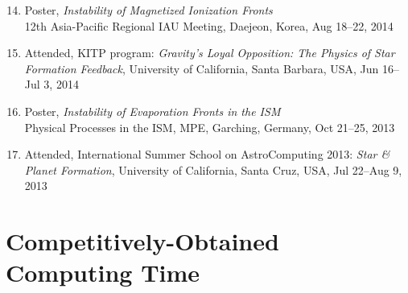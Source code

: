 \documentclass[11pt,letterpaper,roman]{moderncv}        %
\newenvironment{benumerate}[1]{
  \let\oldItem\item
  \def\item{\addtocounter{enumi}{-2}\oldItem}
  \begin{enumerate}[itemsep=0.0mm]
    \setcounter{enumi}{#1}
    \addtocounter{enumi}{1}
  }{
  \end{enumerate}
}
\begin{document}
\begin{benumerate}{13}
{    Interstellar Medium}\\ Star Formation/ISM Rendezvous, Princeton
  University, USA, Nov 5, 2014
\item Poster, \textit{Instability of Magnetized Ionization Fronts}\\
  12th Asia-Pacific Regional IAU Meeting, Daejeon, Korea, Aug 18--22,
  2014
\item Attended, KITP program: \textit{Gravity's Loyal Opposition: The
  Physics of Star Formation Feedback}, University of California, Santa
  Barbara, USA, Jun 16--Jul 3, 2014
\item Poster, \textit{Instability of Evaporation Fronts in the ISM}\\
  Physical Processes in the ISM, MPE, Garching, Germany, Oct 21--25,
  2013
\item Attended, International Summer School on AstroComputing 2013:
  \textit{Star \& Planet Formation}, University of California, Santa
  Cruz, USA, Jul 22--Aug 9, 2013
\end{benumerate}


\section{Competitively-Obtained Computing Time}
\end{document}
